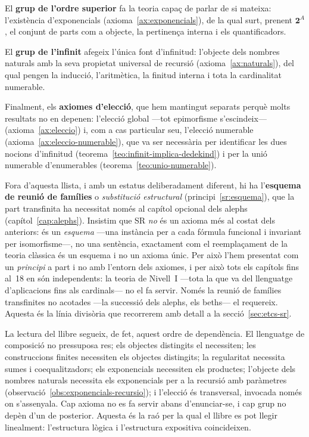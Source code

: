 El \textbf{grup de l'ordre superior} fa la teoria capaç de parlar de si
mateixa: l'existència d'exponencials (axioma~\ref{ax:exponencials}), de la
qual surt, prenent \(\mathbf2^{A}\), el conjunt de parts com a objecte, la
pertinença interna i els quantificadors.

El \textbf{grup de l'infinit} afegeix l'única font d'infinitud: l'objecte
dels nombres naturals amb la seva propietat universal de recursió
(axioma~\ref{ax:naturals}), del qual pengen la inducció, l'aritmètica, la
finitud interna i tota la cardinalitat numerable.

Finalment, els \textbf{axiomes d'elecció}, que hem mantingut separats
perquè molts resultats no en depenen: l'elecció global ---tot epimorfisme
s'escindeix--- (axioma~\ref{ax:eleccio}) i, com a cas particular seu,
l'elecció numerable (axioma~\ref{ax:eleccio-numerable}), que va ser
necessària per identificar les dues nocions d'infinitud
(teorema~\ref{teo:infinit-implica-dedekind}) i per la unió numerable
d'enumerables (teorema~\ref{teo:unio-numerable}).

Fora d'aquesta llista, i amb un estatus deliberadament diferent, hi ha
l'\textbf{esquema de reunió de famílies} o \emph{substitució estructural}
(principi~\ref{sr:esquema}), que la part transfinita ha necessitat només al
capítol opcional dels alephs (capítol~\ref{cap:alephs}). Insistim que SR \emph{no} és un axioma més al costat dels anteriors: és un
\emph{esquema} ---una instància per a cada fórmula funcional i invariant per
isomorfisme---, no una sentència, exactament com el reemplaçament de la
teoria clàssica és un esquema i no un axioma únic. Per això l'hem presentat
com un \emph{principi} a part i no amb l'entorn dels axiomes, i per això tots
els capítols fins al~18 en són independents: la teoria de Nivell~I ---tota
la que va del llenguatge d'aplicacions fins als cardinals--- no el fa servir.
Només la reunió de famílies transfinites no acotades ---la successió dels
alephs, els beths--- el requereix. Aquesta és la línia divisòria que
recorrerem amb detall a la secció~\ref{sec:etcs-sr}.

\begin{observacio}\label{obs:mapa-dependencies}
La lectura del llibre segueix, de fet, aquest ordre de dependència. El
llenguatge de composició no pressuposa res; els objectes distingits el
necessiten; les construccions finites necessiten els objectes distingits;
la regularitat necessita sumes i coequalitzadors; els exponencials
necessiten els productes; l'objecte dels nombres naturals necessita els
exponencials per a la recursió amb paràmetres
(observació~\ref{obs:exponencials-recursio}); i l'elecció és transversal,
invocada només on s'assenyala. Cap axioma no es fa servir abans
d'enunciar-se, i cap grup no depèn d'un de posterior. Aquesta és la raó
per la qual el llibre es pot llegir linealment: l'estructura lògica i
l'estructura expositiva coincideixen.
\end{observacio}

